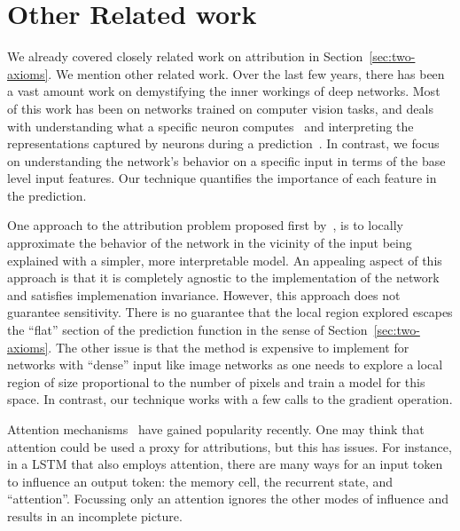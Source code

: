 \section{Other Related work}\label{sec:related}
We already covered closely related work on attribution in
Section~\ref{sec:two-axioms}.  We mention other related work.
Over the last few years, there has been a vast amount work on
demystifying the inner workings of deep networks. Most of this work
has been on networks trained on computer vision tasks, and deals with
understanding what a specific neuron computes~\cite{EBCV09, QVL13}
and interpreting the representations captured by neurons during a
prediction~\cite{MV15, DB15, YCNFL15}. In contrast, we focus on
understanding the network's behavior on a specific input in terms of
the base level input features. Our technique quantifies the importance
of each feature in the prediction.


 One approach to the attribution problem proposed first
 by~\cite{RSG16a, RSG16b}, is to locally approximate the behavior of
 the network in the vicinity of the input being explained with a
 simpler, more interpretable model.  An appealing aspect of this
 approach is that it is completely agnostic to the implementation of
 the network and satisfies implemenation invariance. However, this
 approach does not guarantee sensitivity. There is no guarantee that
 the local region explored escapes the ``flat'' section of the
 prediction function in the sense of Section~\ref{sec:two-axioms}. The other
 issue is that the method is expensive to implement for networks with
 ``dense'' input like image networks as one needs to explore a local
 region of size proportional to the number of pixels and train a model
 for this space. In contrast, our technique works with a few calls to
 the gradient operation.

Attention mechanisms~\cite{BahdanauCB14} have gained popularity recently. One may think that
attention could be used a proxy for attributions, but this has issues. For instance, in a LSTM that also employs attention, there are many ways for an input token to influence an output token: the memory cell, the recurrent state, and ``attention''.
Focussing only an attention ignores the other modes of influence and results in an incomplete picture. 

 

